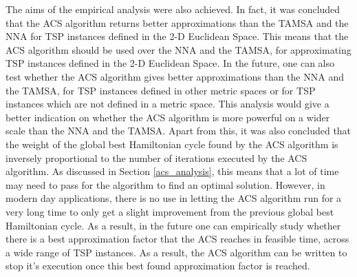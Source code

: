 \documentclass[12pt]{article}
\numberwithin{equation}{subsection}
\numberwithin{table}{subsection}
\numberwithin{algorithm}{subsection}
\numberwithin{figure}{subsection}
\begin{document}
The aims of the empirical analysis were also achieved. In fact, it was concluded that the ACS algorithm returns better approximations than the TAMSA and the NNA for TSP instances defined in the 2-D Euclidean Space. This means that the ACS algorithm should be used over the NNA and the TAMSA, for approximating TSP instances defined in the 2-D Euclidean Space. In the future, one can also test whether the ACS algorithm gives better approximations than the NNA and the TAMSA, for TSP instances defined in other metric spaces or for TSP instances which are not defined in a metric space. This analysis would give a better indication on whether the ACS algorithm is more powerful on a wider scale than the NNA and the TAMSA. Apart from this, it was also concluded that the weight of the global best Hamiltonian cycle found by the ACS algorithm is inversely proportional to the number of iterations executed by the ACS algorithm. As discussed in Section \ref{acs_analysis}, this means that a lot of time may need to pass for the algorithm to find an optimal solution. However, in modern day applications, there is no use in letting the ACS algorithm run for a very long time to only get a slight improvement from the previous global best Hamiltonian cycle. As a result, in the future one can empirically study whether there is a best approximation factor that the ACS reaches in feasible time, across a wide range of TSP instances. As a result, the ACS algorithm can be written to stop it's execution once this best found approximation factor is reached.
\newpage
\begin{center}\end{center}

\end{document}
